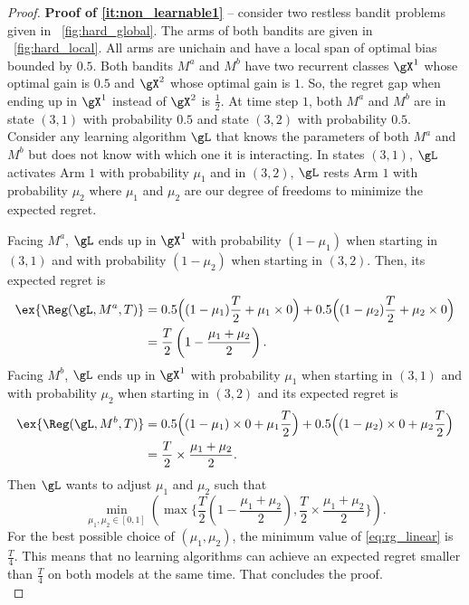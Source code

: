 \begin{proof}
    \textbf{Proof of \ref{it:non_learnable1}} -- consider two restless bandit problems given in \figurename~\ref{fig:hard_global}.
    The arms of both bandits are given in \figurename~\ref{fig:hard_local}.
    All arms are unichain and have a local span of optimal bias bounded by $0.5$.
    Both bandits $M^a$ and $M^b$ have two recurrent classes $\gX^1$ whose optimal gain is $0.5$ and $\gX^2$ whose optimal gain is $1$.
    So, the regret gap when ending up in $\gX^1$ instead of $\gX^2$ is $\frac12$.
    At time step $1$, both $M^a$ and $M^b$ are in state $(3,1)$ with probability $0.5$ and state $(3,2)$ with probability $0.5$.
    Consider any learning algorithm $\gL$ that knows the parameters of both $M^a$ and $M^b$ but does not know with which one it is interacting.
    In states $(3,1)$, $\gL$ activates Arm $1$ with probability $\mu_1$ and in $(3,2)$, $\gL$  rests Arm $1$ with probability $\mu_2$ where $\mu_1$ and $\mu_2$ are our degree of freedoms to minimize the expected regret.

    Facing $M^a$, $\gL$ ends up in $\gX^1$ with probability $(1-\mu_1)$ when starting in $(3,1)$ and with probability $(1-\mu_2)$ when starting in $(3,2)$.
    Then, its expected regret is
    \begin{align*}
        \ex{\Reg(\gL,M^a,T)}
        &=0.5\Bigl((1-\mu_1)\frac{T}2 +\mu_1\times 0\Bigr) +0.5\Bigl((1-\mu_2)\frac{T}2 +\mu_2\times 0\Bigr)\\
        &=\frac{T}2\left(1-\frac{\mu_1+\mu_2}2\right).
    \end{align*}
    Facing $M^b$, $\gL$ ends up in $\gX^1$ with probability $\mu_1$ when starting in $(3,1)$ and with probability $\mu_2$ when starting in $(3,2)$ and its expected regret is
    \begin{align*}
        \ex{\Reg(\gL,M^b,T)}
        &=0.5\Bigl((1-\mu_1)\times 0 +\mu_1\frac{T}2\Bigr) +0.5\Bigl((1-\mu_2)\times 0 +\mu_2\frac{T}2\Bigr)\\
        &=\frac{T}2\times\frac{\mu_1+\mu_2}2.
    \end{align*}
    Then $\gL$ wants to adjust $\mu_1$ and $\mu_2$ such that
    \begin{equation}
        \label{eq:rg_linear}
        \min_{\mu_1,\mu_2\in[0,1]}\left(\max\biggl\{\frac{T}2\left(1-\frac{\mu_1+\mu_2}2\right), \frac{T}2\times\frac{\mu_1+\mu_2}2\biggr\}\right).
    \end{equation}
    For the best possible choice of $(\mu_1,\mu_2)$, the minimum value of \eqref{eq:rg_linear} is $\displaystyle\frac{T}4$.
    This means that no learning algorithms can achieve an expected regret smaller than $\frac{T}4$ on both models at the same time.
    That concludes the proof.
    \medskip \\


\end{proof}
